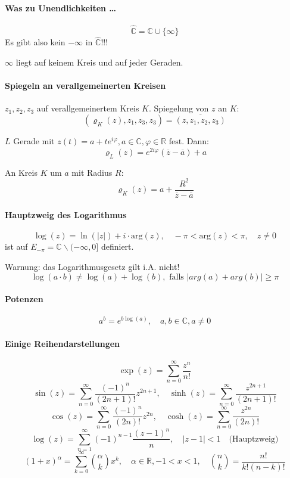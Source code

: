 \documentclass[a4paper, 10pt, DIV20, headings=small]{scrartcl}
\theoremstyle{definition}
\theoremstyle{plain}
\begin{document}
\paragraph{Was zu Unendlichkeiten \ldots}
$$\widehat{\mathbb{C}} = \mathbb{C} \cup \{\infty\}$$
Es gibt also kein $- \infty$ in $\widehat{\mathbb{C}}$!!!

$\infty$ liegt auf keinem Kreis und auf jeder Geraden.

\paragraph{Spiegeln an verallgemeinerten Kreisen}
$z_1,z_2,z_3$ auf verallgemeinertem Kreis $K$. Spiegelung von $z$ an $K$:
$$(\varrho_K(z),z_1,z_3,z_3) = \overline{(z,z_1,z_2,z_3)}$$

$L$ Gerade mit $z(t) = a + t e^{i \varphi}, a \in \mathbb{C}, \varphi \in \mathbb{R} \text{ fest}$.
Dann:
$$\varrho_L(z) = e^{2 i \varphi} (\overline{z} - \overline{a}) + a$$

An Kreis $K$ um $a$ mit Radius $R$:
$$\varrho_K(z) = a + \frac{R^2}{\overline{z}- \overline{a}}$$

\paragraph{Hauptzweig des Logarithmus}
$$\log(z) = \ln(|z|) + i \cdot \text{arg}(z), \quad -\pi < \text{arg}(z) < \pi, \quad z \neq 0$$
ist auf $E_{- \pi} = \mathbb{C} \backslash (-\infty,0]$ definiert.

Warnung: das Logarithmusgesetz gilt i.A. nicht!
$$\log(a \cdot b) \neq \log(a) + \log(b), \text{ falls } |arg(a)+arg(b)| \geq \pi$$

\paragraph{Potenzen}
$$a^b = e^{b \log (a)}, \quad a,b \in \mathbb{C}, a \neq 0$$

\paragraph{Einige Reihendarstellungen}
$$\exp(z) = \sum\limits_{n=0}^\infty{\frac{z^n}{n!}}$$
$$\sin(z) = \sum\limits_{n=0}^\infty{\frac{(-1)^n}{(2n+1)!} z^{2n+1}}, \quad \sinh(z) = \sum\limits_{n=0}^\infty{\frac{z^{2n+1}}{(2n+1)!}}$$
$$\cos(z) = \sum\limits_{n=0}^\infty{\frac{(-1)^n}{(2n)!} z^{2n}}, \quad \cosh(z) = \sum\limits_{n=0}^\infty{\frac{z^{2n}}{(2n)!}}$$
$$\log(z) = \sum\limits_{n=1}^\infty{(-1)^{n-1} \frac{(z-1)^n}{n}}, \quad |z-1|<1 \quad \text{(Hauptzweig)}$$
$$(1+x)^\alpha = \sum\limits_{k=0}^{\infty}{{\alpha \choose k} x^k}, \quad \alpha \in \mathbb{R}, -1 < x < 1, \quad {n \choose k} = \frac{n!}{k! (n-k)!}$$
\end{document}
